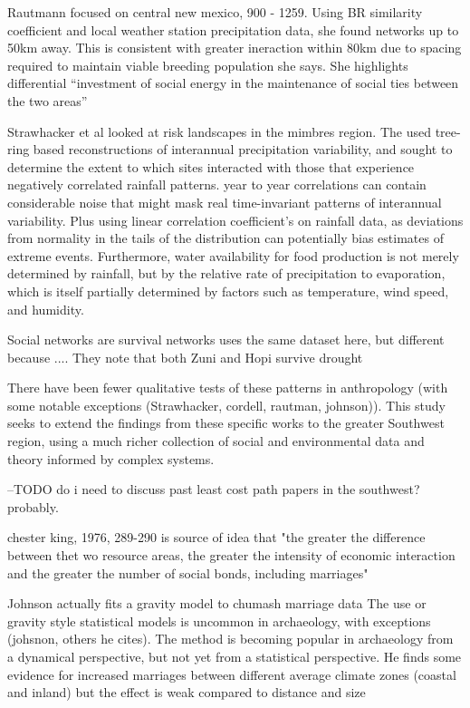 \documentclass[fleqn,10pt]{wlscirep}
\begin{document}
Rautmann focused on central new mexico, 900 - 1259. Using BR similarity coefficient and local weather station precipitation data, she found networks up to 50km away. This is consistent with greater ineraction within 80km due to spacing required to maintain viable breeding population she says. She highlights differential ``investment of social energy in the maintenance of social ties between the two areas''

Strawhacker et al looked at risk landscapes in the mimbres region. The used tree-ring based reconstructions of interannual precipitation variability, and sought to determine the extent to which sites interacted with those that experience negatively correlated rainfall patterns.
year to year correlations can contain considerable noise that might mask real time-invariant patterns of interannual variability. Plus using linear correlation coefficient's on rainfall data, as deviations from normality in the tails of the distribution can potentially bias estimates of extreme events. Furthermore, water availability for food production is not merely determined by rainfall, but by the relative rate of precipitation to evaporation, which is itself partially determined by factors such as temperature, wind speed, and humidity.

Social networks are survival networks uses the same dataset here, but different because ....
They note that both Zuni and Hopi survive drought

There have been fewer qualitative tests of these patterns in anthropology (with some notable exceptions (Strawhacker, cordell, rautman, johnson)). This study seeks to extend the findings from these specific works to the greater Southwest region, using a much richer collection of social and environmental data and theory informed by complex systems.


--TODO do i need to discuss past least cost path papers in the southwest? probably.

chester king, 1976, 289-290 is source of idea that "the greater the difference between thet wo resource areas, the greater the intensity of economic interaction and the greater the number of social bonds, including marriages"

Johnson actually fits a gravity model to chumash marriage data
The use or gravity style statistical models is uncommon in archaeology, with exceptions (johsnon, others he cites). The method is becoming popular in archaeology from a dynamical perspective, but not yet from a statistical perspective.
He finds some evidence for increased marriages between different average climate zones (coastal and inland) but the effect is weak compared to distance and  size
\end{document}
